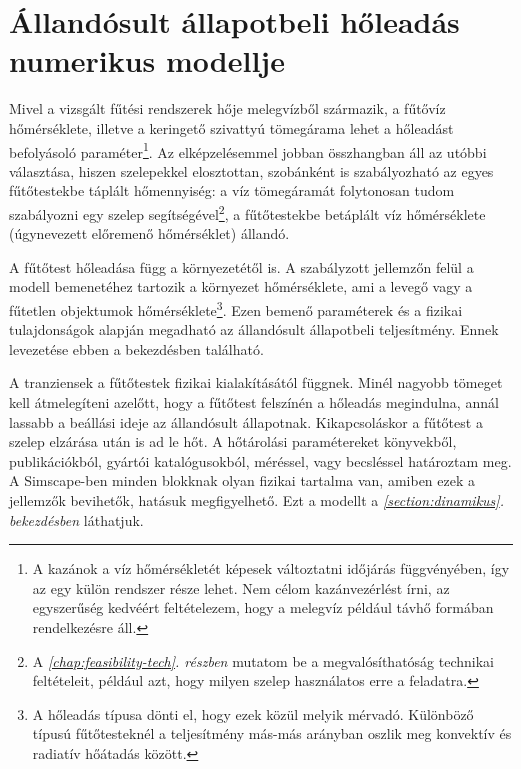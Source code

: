 \section{Állandósult állapotbeli hőleadás numerikus modellje}\label{section:allandosult}

Mivel a vizsgált fűtési rendszerek hője melegvízből származik, a fűtővíz %
hőmérséklete, illetve a keringető szivattyú tömegárama lehet a hőleadást befolyásoló paraméter\footnote{A kazánok a víz hőmérsékletét képesek változtatni időjárás függvényében, így az egy külön rendszer része lehet. Nem célom kazánvezérlést írni, az egyszerűség kedvéért feltételezem, hogy a melegvíz például távhő formában rendelkezésre áll.}. Az elképzelésemmel jobban összhangban áll az utóbbi választása, hiszen szelepekkel elosztottan, szobánként is szabályozható az egyes fűtőtestekbe táplált hőmennyiség: a víz tömegáramát folytonosan tudom szabályozni egy szelep segítségével\footnote{A \textit{\ref{chap:feasibility-tech}. részben} mutatom be a megvalósíthatóság technikai feltételeit, például azt, hogy milyen szelep használatos erre a feladatra.}, a fűtőtestekbe betáplált víz hőmérséklete (úgynevezett előremenő hőmérséklet) állandó.


A fűtőtest hőleadása függ a környezetétől is. A szabályzott jellemzőn felül a modell bemenetéhez tartozik a környezet hőmérséklete, ami a levegő vagy a fűtetlen objektumok hőmérséklete\footnote{A hőleadás típusa dönti el, hogy ezek közül melyik mérvadó. Különböző típusú fűtőtesteknél a teljesítmény más-más arányban oszlik meg konvektív és radiatív hőátadás között.}.
Ezen bemenő paraméterek és a fizikai tulajdonságok alapján megadható az állandósult állapotbeli teljesítmény. Ennek levezetése ebben a bekezdésben található.

A tranziensek a fűtőtestek fizikai kialakításától függnek. Minél nagyobb tömeget kell átmelegíteni azelőtt, hogy a fűtőtest felszínén a hőleadás megindulna, annál lassabb a beállási ideje az állandósult állapotnak. Kikapcsoláskor a fűtőtest a szelep elzárása után is ad le hőt. %
A hőtárolási paramétereket könyvekből, publikációkból, gyártói katalógusokból, méréssel, vagy becsléssel határoztam meg. A Simscape-ben minden blokknak olyan fizikai tartalma van, amiben ezek a jellemzők bevihetők, hatásuk megfigyelhető. Ezt a modellt a \textit{\ref{section:dinamikus}. bekezdésben} láthatjuk.

